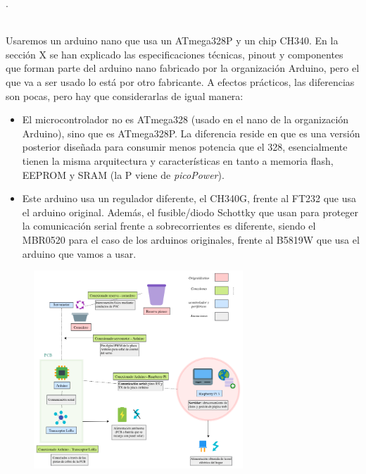 \documentclass[12pt]{article}
\begin{document}
	. \\
	
	\pagebreak
	
	 \\
	
	\noindent Usaremos un arduino nano que usa un ATmega328P y un chip CH340. En la sección X se han explicado las especificaciones técnicas, pinout y componentes que forman parte del arduino nano fabricado por la organización Arduino, pero el que va a ser usado lo está por otro fabricante. A efectos prácticos, las diferencias son pocas, pero hay que considerarlas de igual manera:
	
	\begin{itemize}
		\item El microcontrolador no es ATmega328 (usado en el nano de la organización Arduino), sino que es ATmega328P. La diferencia reside en que es una versión posterior diseñada para consumir menos potencia que el 328, esencialmente tienen la misma arquitectura y características en tanto a memoria flash, EEPROM y SRAM (la P viene de \textit{picoPower}).
		\item Este arduino usa un regulador diferente, el CH340G, frente al FT232 que usa el arduino original. Además, el fusible/diodo Schottky que usan para proteger la comunicación serial frente a sobrecorrientes es diferente, siendo el MBR0520 para el caso de los arduinos originales, frente al B5819W que usa el arduino que vamos a usar.
	\end{itemize}

	\pagebreak
	
		\begin{figure}[h]
		\begin{center}
			\includegraphics[width=0.7\textwidth]{img/conexiones tfg-comedero.png}
			\caption{}
			\label{Conexiones TFG comedero.}
		\end{center}
	\end{figure}
	
\end{document}
